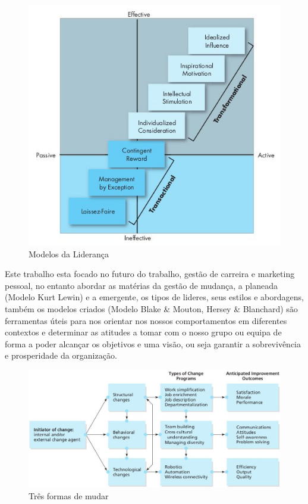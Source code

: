 \begin{figure}[H]
	\centering
	\includegraphics[scale=0.52]{./image/Leadership/Leadership_Models.jpg}
	\caption{Modelos da Liderança \cite{book-2}}
\end{figure}
Este trabalho esta focado no futuro do trabalho, gestão de carreira e marketing pessoal, no entanto abordar as matérias da gestão de mudança, a planeada (Modelo Kurt Lewin) e a emergente, os tipos de lideres, seus estilos e abordagens, também os modelos criados (Modelo Blake \& Mouton, Hersey \& Blanchard) são ferramentas úteis para nos orientar nos nossos comportamentos em diferentes contextos e determinar as atitudes a tomar com o nosso grupo ou equipa de forma a poder alcançar os objetivos e uma visão, ou seja garantir a sobrevivência e prosperidade da organização.
\begin{figure}[H]
	\centering
	\includegraphics[scale=0.52]{./image/Change/Three_Change_Approaches.jpg}
	\caption{Três formas de mudar \cite{book-6}}
\end{figure}
